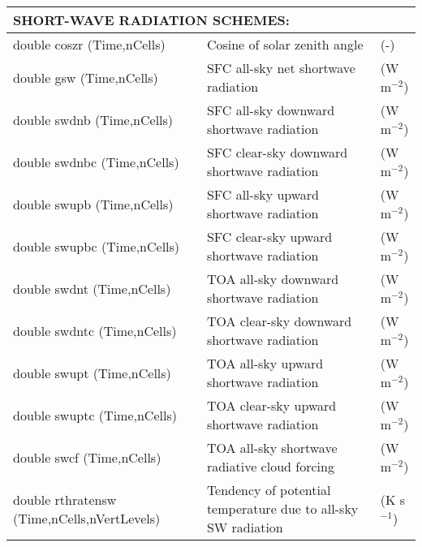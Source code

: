 {\small
\begin{longtable}{|p{2.0in} |p{3.0in} |p{1.0in} |}
\hline
\multicolumn{3}{|l|}{{\rule[-3mm]{0mm}{8mm}\bf SHORT-WAVE RADIATION SCHEMES:} \hfill}\\ \hline
double coszr  (Time,nCells) & Cosine of solar zenith angle & (-) \\ \hline
double gsw (Time,nCells) & SFC all-sky net shortwave radiation & (W m$^{-2}$) \\ \hline
double swdnb (Time,nCells) & SFC all-sky downward shortwave radiation & (W m$^{-2}$) \\ \hline
double swdnbc (Time,nCells) & SFC clear-sky downward shortwave radiation & (W m$^{-2}$) \\ \hline
double swupb (Time,nCells) & SFC all-sky upward shortwave radiation & (W m$^{-2}$) \\ \hline
double swupbc (Time,nCells) & SFC clear-sky upward shortwave radiation & (W m$^{-2}$) \\ \hline
double swdnt (Time,nCells) & TOA all-sky downward shortwave radiation & (W m$^{-2}$) \\ \hline
double swdntc (Time,nCells) & TOA clear-sky downward shortwave radiation & (W m$^{-2}$) \\ \hline
double swupt (Time,nCells) & TOA all-sky upward shortwave radiation & (W m$^{-2}$) \\ \hline
double swuptc (Time,nCells) & TOA clear-sky upward shortwave radiation & (W m$^{-2}$) \\ \hline
double swcf (Time,nCells) & TOA all-sky shortwave radiative cloud forcing & (W m$^{-2}$) \\ \hline
double rthratensw \hfil\break (Time,nCells,nVertLevels) & Tendency of potential temperature due to all-sky SW radiation & (K s$^{-1}$) \\ \hline


\end{longtable}}
